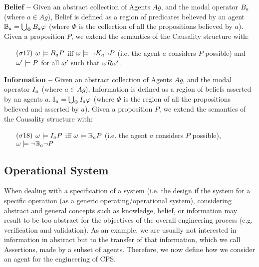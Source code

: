 \begin{definition}{\bf Belief --}\label{def:belief}
	Given an abstract collection of Agents $Ag$, and the modal operator
	$B_{a}$ (where $a\in Ag$), Belief is defined as a region 
	of predicates believed by an agent $\mathbb{B}_{a}=\bigcup_\Phi B_{a}\varphi$
	(where $\Phi$ is the collection of all the propositions believed by $a$).
	Given a proposition $P$, we extend the semantics of the Causality structure with:
	\begin{enumerate}[noitemsep]
		\item[$(\sigma17)$] $\omega\models B_{a}P$ iff
			$\omega\models\neg K_{a}\neg P$ (i.e. the agent $a$ considers $P$ possible) 
			and $\omega'\models P$ for all
			$\omega'$ such that $\omega R\omega'$.
	\end{enumerate}
\end{definition}

\begin{definition}{\bf Information --}\label{def:information}
	Given an abstract collection of Agents $Ag$, and the modal operator
	$I_{a}$ (where $a\in Ag$), Information is defined as a region 
	of beliefs asserted by an agents $a$.
	$\mathbb{I}_{a}=\bigcup_\Phi I_{a}{\varphi}$
	(where $\Phi$ is the region of all the propositions believed and asserted by $a$).
	Given a proposition $P$, we extend the semantics of the Causality structure with:
	\begin{enumerate}[noitemsep]
		\item[$(\sigma18)$] $\omega\models I_{a}P$ iff
			$\omega\models\mathbb{B}_{a}{P}$ (i.e. the agent $a$ considers $P$ possible), 
			$\omega\models\neg\mathbb{B}_{a}{\neg P}$%
	\end{enumerate}
\end{definition}

\subsection{Operational System}\label{sec:engsystemstate}
When dealing with a specification of a system (i.e. the design if the system
for a specific operation (as a generic operating/operational system),
considering abstract and general concepts such as knowledge, belief, or
information may result to be too abstract 
for the objectives of the overall engineering
process (e.g. verification and validation).
As an example, we are usually not
interested in information in abstract but to the transfer of that
information, which we call Assertions, made by a subset of agents. 
Therefore, we now define how we consider an agent for the engineering
of CPS.


